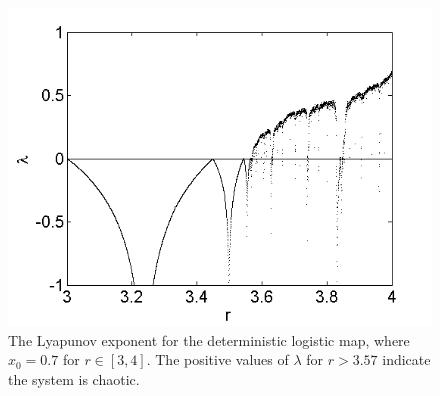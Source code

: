 \begin{figure}[!h]
\caption[Lyapunov exponent in the deterministic logistic map]{The
  Lyapunov exponent for the deterministic
  logistic map, where $x_0=0.7$ for $r \in
  [3,4]$. The positive values of $\lambda$ for $r>3.57$ indicate the system is chaotic.}\label{fig:detloglyap}
	\begin{center}
		\includegraphics[scale=0.65]{figs/det_log_lyap.png}
	\end{center}
\end{figure} 


